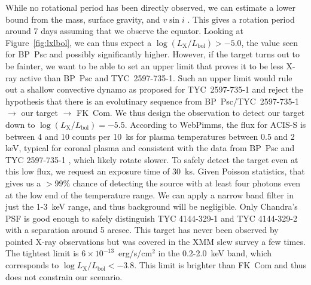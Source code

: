 \documentclass[letterpaper,11pt]{article}
\makeatletter
\renewcommand{\section}{\@startsection%
{section}{1}{0mm}{-\baselineskip}%
{0.5\baselineskip}{\normalfont\Large\bfseries}}%
\makeatother
\begin{document}
While no rotational period has been directly observed, we can estimate a lower bound from the mass, surface gravity, and $v\sin i$ \cite{2009ApJ...696.1964M}. This gives a rotation period around 7 days assuming that we observe the equator. Looking at Figure~\ref{fig:lxlbol}, we can thus expect a $\log(L_\mathrm{X}/L_\mathrm{bol}) > -5.0$, the value seen for BP~Psc and possibly significantly higher. However, if the target turns out to be fainter, we want to be able to set an upper limit that proves it to be less X-ray active than BP~Psc and TYC~2597-735-1. Such an upper limit would rule out a shallow convective dynamo as proposed for TYC~2597-735-1 and reject the hypothesis that there is an evolutinary sequence from BP~Psc/TYC~2597-735-1 $\rightarrow$ our target $\rightarrow$ FK~Com. We thus design the observation to detect our target down to  $\log(L_\mathrm{X}/L_\mathrm{bol}) = -5.5$. According to WebPimms, the flux for ACIS-S is between 4 and 10 counts per 10~ks for plasma temperatures between 0.5 and 2 keV, typical for coronal plasma and consistent with the data from BP~Psc \cite{2010ApJ...719L..65K} and TYC 2597-735-1 \cite{2022arXiv220205424G}, which likely rotate slower. To safely detect the target even at this low flux, we request an exposure time of 30~ks. Given Poisson statistics, that gives us a $>99$\% chance of detecting the source with at least four photons even at the low end of the temperature range. We can apply a narrow band filter in just the 1-3~keV range, and thus background will be negligible. Only Chandra's PSF is good enough to safely distinguish TYC 4144-329-1 and TYC 4144-329-2 with a separation around 5 arcsec. This target has never been observed by pointed X-ray observations but was covered in the XMM slew survey a few times. The tightest limit is $6\times 10^{-13}$~erg/s/cm$^2$ in the 0.2-2.0~keV band, which corresponds to $\log L_\mathrm{X}/L_\mathrm{bol} < -3.8$. This limit is brighter than FK~Com and thus does not constrain our scenario.












{}



\end{document}
